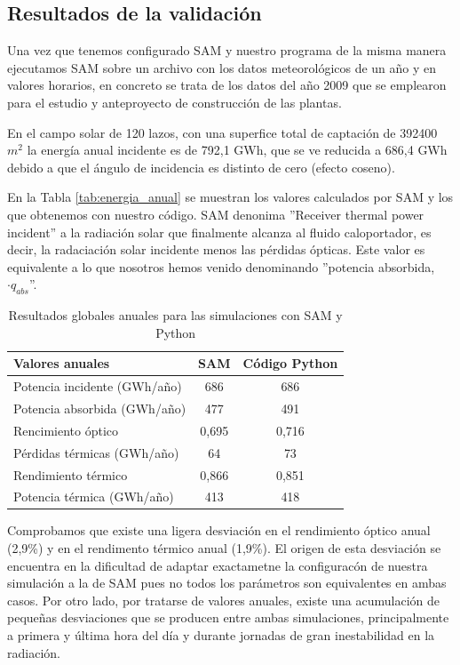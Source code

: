 \subsection{Resultados de la validación}
\label{resultados-validacion}
 
Una vez que tenemos configurado SAM y nuestro programa de la misma manera ejecutamos SAM sobre un archivo con los datos meteorológicos de un año y en valores horarios, en concreto se trata de los datos del año 2009 que se emplearon para el estudio y anteproyecto de construcción de las plantas.  

En el campo solar de 120 lazos, con una superfice total de captación de 392400 $m^2$ la energía anual incidente es de 792,1 GWh, que se ve reducida a 686,4 GWh debido a que el ángulo de incidencia es distinto de cero (efecto coseno).

En la Tabla \ref{tab:energia_anual} se muestran los valores  calculados por SAM y los que obtenemos con nuestro código. SAM denonima ''Receiver thermal power incident'' a la radiación solar que finalmente alcanza al fluido caloportador, es decir, la radaciación solar incidente menos las pérdidas ópticas. Este valor es equivalente a lo que nosotros hemos venido denominando ''potencia absorbida, $\cdot q_{abs}$''. 

\begin{table}[!h]
\centering
\caption{Resultados globales anuales para las simulaciones con SAM y Python}
\label{tab:generacion_anual}
\begin{tabular}{lcc}
Valores anuales  & SAM & Código Python \\ \hline
Potencia incidente (GWh/año)	& 686		& 686			\\ 
Potencia absorbida (GWh/año)	& 477		& 491			\\ 
Rencimiento óptico 			& 0,695	 	& 0,716			\\ 
Pérdidas térmicas (GWh/año)	& 64		& 73			\\ 
Rendimiento térmico			& 0,866		& 0,851			\\ 
Potencia térmica (GWh/año) 	& 413		& 418	        	\\ 
\end{tabular}
\end{table}

Comprobamos que existe una ligera desviación en el rendimiento óptico anual (2,9\%) y en el rendimento térmico anual (1,9\%). El origen de esta desviación se encuentra en la dificultad de adaptar exactametne la configuracón de nuestra simulación a la de SAM pues no todos los parámetros son equivalentes en ambas casos. Por otro lado, por tratarse de valores anuales, existe una acumulación de pequeñas desviaciones que se producen entre ambas simulaciones, principalmente a primera y última hora del día  y durante jornadas de gran inestabilidad en la radiación. 

